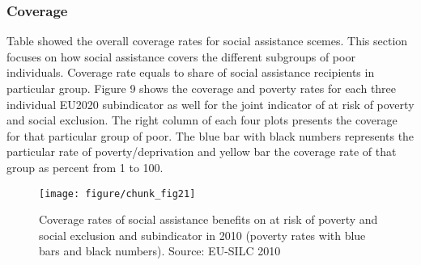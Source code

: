 \documentclass[11pt, a4paper]{article}\usepackage{graphicx, color}
\makeatletter
\def\maxwidth{ %
  \ifdim\Gin@nat@width>\linewidth
    \linewidth
  \else
    \Gin@nat@width
  \fi
}
\newenvironment{knitrout}{}{} %
\makeatother
\begin{document}
\subsubsection*{Coverage}

Table showed the overall coverage rates for social assistance scemes. This section focuses on how social assistance covers the different subgroups of poor individuals. Coverage rate equals to share of social assistance recipients in particular group. Figure 9 shows the coverage and poverty rates for each three individual EU2020 subindicator as well for the joint indicator of at risk of poverty and social exclusion. The right column of each four plots presents the coverage for that particular group of poor. The blue bar with black numbers represents the particular rate of poverty/deprivation and yellow bar the coverage rate of that group as percent from 1 to 100.







\begin{knitrout}
\color{fgcolor}\begin{figure}[H]
\texttt{[image: figure/chunk\_fig21]} \caption[Coverage rates of social assistance benefits on at risk of poverty and social exclusion and subindicator in 2010 (poverty rates with blue bars and black numbers)]{Coverage rates of social assistance benefits on at risk of poverty and social exclusion and subindicator in 2010 (poverty rates with blue bars and black numbers). Source: EU-SILC 2010\label{fig:chunk_fig21}}
\end{figure}

\end{knitrout}


\end{document}
